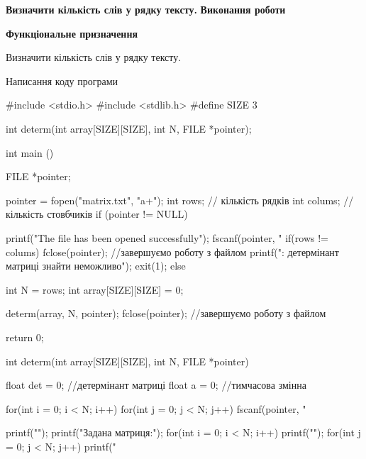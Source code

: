 
\begin{DoxyEnumerate}
\item {\bfseries{Визначити кількість слів у рядку тексту.}} {\bfseries{Виконання роботи}}
\end{DoxyEnumerate}
\begin{DoxyEnumerate}
\item {\bfseries{Функціональне призначення}}

Визначити кількість слів у рядку тексту.
\item Написання коду програми \begin{DoxyVerb}     #include <stdio.h>
     #include <stdlib.h>
     #define SIZE 3


     int determ(int array[SIZE][SIZE], int N, FILE *pointer);

     int main () 
     {
         FILE *pointer;

         pointer = fopen("matrix.txt", "a+");
         int rows; // кількість рядків
         int colums; // кількість стовбчиків
         if (pointer != NULL)
         {
             printf("The file has been opened successfully\n");
             fscanf(pointer, "%
             if(rows != colums)
             {
                 fclose(pointer); //завершуємо роботу з файлом
                 printf("\nError: детермінант матриці знайти неможливо\n\n");
                 exit(1);
             }
             else
             {

                 int N = rows;
                 int array[SIZE][SIZE] = {0};

                 determ(array, N, pointer);
                 fclose(pointer); //завершуємо роботу з файлом
             }
         }

     return 0;

     }

     int determ(int array[SIZE][SIZE], int N, FILE *pointer)
     {
         float det = 0;  //детермінант матриці
         float a = 0; //тимчасова змінна

         for(int i = 0; i < N; i++)
         {
             for(int j = 0; j < N; j++)
             {
                 fscanf(pointer, "%
             }
         }

         printf("\n");
         printf("Задана матриця:");
         for(int i = 0; i < N; i++)
         {
             printf("\n");
             for(int j = 0; j < N; j++)
             {
                 printf("%
             }
         }

}
\end{DoxyVerb}
\end{DoxyEnumerate}
